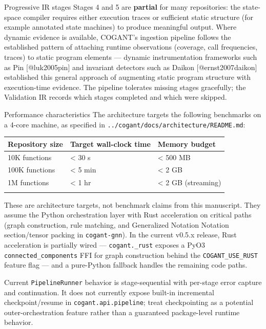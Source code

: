 \documentclass[
  ignorenonframetext,
]{beamer}
\newcounter{none} %
\begin{document}
\begin{frame}{Progressive IR stages}
Stages 4 and 5 are \textbf{partial} for many repositories: the
state-space compiler requires either execution traces or sufficient
static structure (for example annotated state machines) to produce
meaningful output. Where dynamic evidence is available, COGANT's
ingestion pipeline follows the established pattern of attaching runtime
observations (coverage, call frequencies, traces) to static program
elements --- dynamic instrumentation frameworks such as Pin
{[}@luk2005pin{]} and invariant detectors such as Daikon
{[}@ernst2007daikon{]} established this general approach of augmenting
static program structure with execution-time evidence. The pipeline
tolerates missing stages gracefully; the Validation IR records which
stages completed and which were skipped.
\end{frame}

\begin{frame}[fragile]{Performance characteristics}
\protect{}\label{performance-characteristics}
The architecture targets the following benchmarks on a 4-core machine,
as specified in \texttt{../cogant/docs/architecture/README.md}:

{\def\LTcaptype{none} %
\begin{longtable}[]{@{}lll@{}}
\toprule\noalign{}
Repository size & Target wall-clock time & Memory budget \\
\midrule\noalign{}
\endhead
10K functions & \textless{} 30 s & \textless{} 500 MB \\
100K functions & \textless{} 5 min & \textless{} 2 GB \\
1M functions & \textless{} 1 hr & \textless{} 2 GB (streaming) \\
\bottomrule\noalign{}
\end{longtable}
}

These are architecture targets, not benchmark claims from this
manuscript. They assume the Python orchestration layer with Rust
acceleration on critical paths (graph construction, rule matching, and
Generalized Notation Notation section/tensor packing in
\texttt{cogant-gnn}). In the current v0.5.x release, Rust acceleration
is partially wired --- \texttt{cogant.\_rust} exposes a PyO3
\texttt{connected\_components} FFI for graph construction behind the
\texttt{COGANT\_USE\_RUST} feature flag --- and a pure-Python fallback
handles the remaining code paths.

Current \texttt{PipelineRunner} behavior is stage-sequential with
per-stage error capture and continuation. It does not currently expose
built-in incremental checkpoint/resume in \texttt{cogant.api.pipeline};
treat checkpointing as a potential outer-orchestration feature rather
than a guaranteed package-level runtime behavior.
\end{frame}
\end{document}
